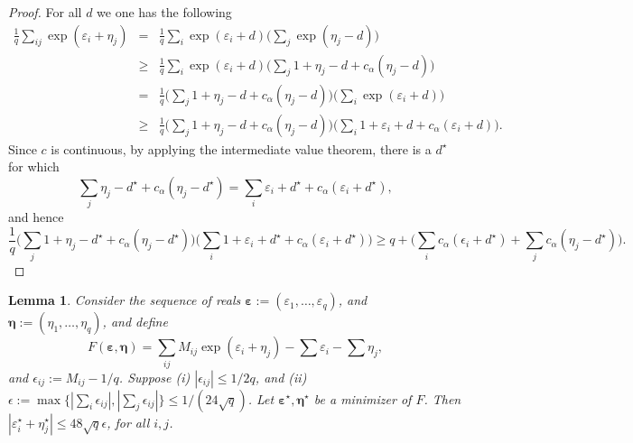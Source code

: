 \documentclass[11pt,letterpaper]{article}
\newtheorem{lemma}[theorem]{Lemma}
\begin{document}
\begin{proof} For all $d$ we one has the following
	\begin{eqnarray*}
		\frac{1}{q}\sum_{ij} \exp(\varepsilon_i + \eta_j ) & = & \frac{1}{q}\sum_{i} \exp(\varepsilon_i+d) \biggl( \sum_j \exp(\eta_j -d) \biggr) \\
		& \geq & \frac{1}{q}\sum_{i} \exp(\varepsilon_i+d) \biggl( \sum_j 1 + \eta_j-d + c_{\alpha} (\eta_j-d) \biggr) \\
		& = & \frac{1}{q}\biggl( \sum_j 1 + \eta_j-d + c_{\alpha} (\eta_j-d) \biggr) \biggl(\sum_{i} \exp(\varepsilon_i+d) \biggr) \\
		& \geq & \frac{1}{q}\biggl( \sum_j 1 + \eta_j-d + c_{\alpha} (\eta_j-d) \biggr) \biggl(\sum_{i} 1+\varepsilon_i+d + c_{\alpha} (\varepsilon_i+d) \biggr).
	\end{eqnarray*}
	Since $c$ is continuous, by applying the intermediate value theorem, there is a $d^{\star}$ for which
	\begin{equation*}
		\sum_j  \eta_j - d^{\star} + c_{\alpha} (\eta_j-d^{\star} ) = \sum_{i} \varepsilon_i + d^{\star} + c_{\alpha} (\varepsilon_i + d^{\star}),
	\end{equation*}
	and hence
	\begin{equation*}
		\frac{1}{q}\biggl( \sum_j 1 + \eta_j - d^{\star} + c_{\alpha} (\eta_j - d^{\star}) \biggr) \biggl(\sum_{i} 1+\varepsilon_i + d^{\star} + c_{\alpha} (\varepsilon_i + d^{\star}) \biggr) \geq q+ \biggl( \sum_{i} c_{\alpha} (\epsilon_i + d^{\star}) + \sum_j c_{\alpha} (\eta_j - d^{\star}) \biggr).
	\end{equation*}
\end{proof}

\begin{lemma} \label{thm:optimalf}
	Consider the sequence of reals $\boldsymbol \varepsilon := (\varepsilon_1,\ldots,\varepsilon_q)$, and $\boldsymbol \eta := (\eta_1,\ldots, \eta_q)$, and define 
	\begin{equation}
		F ( \boldsymbol{ \varepsilon}, \boldsymbol \eta) = \sum_{ij} M_{ij} \exp(\varepsilon_i + \eta_j) - \sum \varepsilon_i - \sum \eta_j,
	\end{equation}
	and $\epsilon_{ij} := M_{ij}- 1/q $. Suppose (i) $|\epsilon_{ij} | \leq 1/2q$, and (ii) $ \epsilon:= \max \{ |\sum_i \epsilon_{ij} |, |\sum_j \epsilon_{ij}| \}\leq 1/(24 \sqrt{q})$.  Let $\boldsymbol \varepsilon^{\star}, \boldsymbol \eta^{\star}$ be a minimizer of $F$.  Then $| \varepsilon_i^{\star} + \eta_j^{\star} | \leq 48 \sqrt{q} \epsilon$, for all $i,j$.
\end{lemma}
\end{document}
